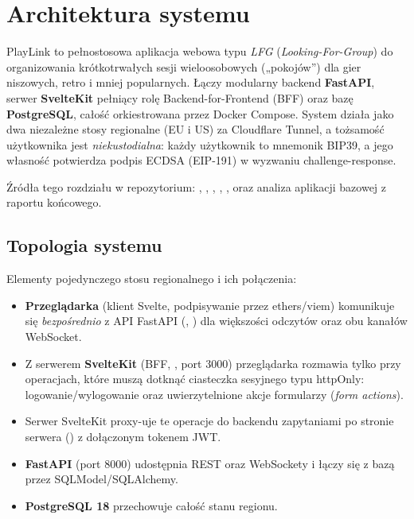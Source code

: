 
\chapter{Architektura systemu}
\label{ch:arch}

PlayLink to pełnostosowa aplikacja webowa typu \emph{LFG} (\textit{Looking-For-Group})
do organizowania krótkotrwałych sesji wieloosobowych („pokojów”) dla gier niszowych,
retro i mniej popularnych. Łączy modularny backend \textbf{FastAPI}, serwer
\textbf{SvelteKit} pełniący rolę Backend-for-Frontend (BFF) oraz bazę
\textbf{PostgreSQL}, całość orkiestrowana przez Docker Compose. System działa jako dwa
niezależne stosy regionalne (EU i US) za Cloudflare Tunnel, a tożsamość użytkownika jest
\emph{niekustodialna}: każdy użytkownik to mnemonik BIP39, a jego własność potwierdza
podpis ECDSA (EIP-191) w wyzwaniu challenge-response.

Źródła tego rozdziału w repozytorium: , ,
, , ,
 oraz analiza aplikacji bazowej z raportu końcowego.

\section{Topologia systemu}
\label{sec:arch-topologia}

Elementy pojedynczego stosu regionalnego i ich połączenia:

\begin{itemize}
  \item \textbf{Przeglądarka} (klient Svelte, podpisywanie przez ethers/viem) komunikuje się
        \emph{bezpośrednio} z API FastAPI (, )
        dla większości odczytów oraz obu kanałów WebSocket.
  \item Z serwerem \textbf{SvelteKit} (BFF, , port 3000) przeglądarka
        rozmawia tylko przy operacjach, które muszą dotknąć ciasteczka sesyjnego
         typu httpOnly: logowanie/wylogowanie oraz uwierzytelnione akcje
        formularzy (\emph{form actions}).
  \item Serwer SvelteKit proxy-uje te operacje do backendu zapytaniami po stronie serwera
        () z dołączonym tokenem JWT.
  \item \textbf{FastAPI} (port 8000) udostępnia REST oraz WebSockety i łączy się z bazą
        przez SQLModel/SQLAlchemy.
  \item \textbf{PostgreSQL 18} przechowuje całość stanu regionu.
\end{itemize}

